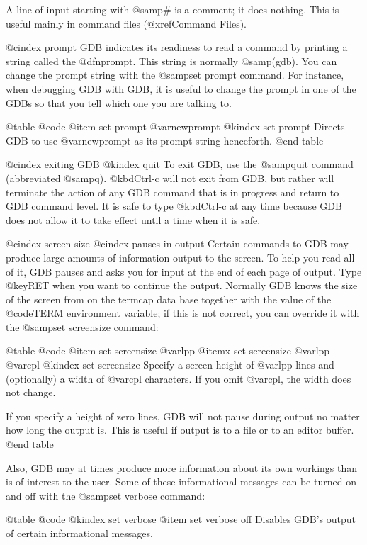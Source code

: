 A line of input starting with @samp{#} is a comment; it does nothing.
This is useful mainly in command files (@xref{Command Files}).

@cindex prompt
GDB indicates its readiness to read a command by printing a string
called the @dfn{prompt}.  This string is normally @samp{(gdb)}.  You can
change the prompt string with the @samp{set prompt} command.  For
instance, when debugging GDB with GDB, it is useful to change the prompt
in one of the GDBs so that you tell which one you are talking to.

@table @code
@item set prompt @var{newprompt}
@kindex set prompt
Directs GDB to use @var{newprompt} as its prompt string henceforth.
@end table

@cindex exiting GDB
@kindex quit
To exit GDB, use the @samp{quit} command (abbreviated @samp{q}).
@kbd{Ctrl-c} will not exit from GDB, but rather will terminate the action
of any GDB command that is in progress and return to GDB command level.
It is safe to type @kbd{Ctrl-c} at any time because GDB does not allow
it to take effect until a time when it is safe.

@cindex screen size
@cindex pauses in output
Certain commands to GDB may produce large amounts of information output
to the screen.  To help you read all of it, GDB pauses and asks you for
input at the end of each page of output.  Type @key{RET} when you want
to continue the output.  Normally GDB knows the size of the screen from
on the termcap data base together with the value of the @code{TERM}
environment variable; if this is not correct, you can override it with
the @samp{set screensize} command:

@table @code
@item set screensize @var{lpp}
@itemx set screensize @var{lpp} @var{cpl}
@kindex set screensize
Specify a screen height of @var{lpp} lines and (optionally) a width of
@var{cpl} characters.  If you omit @var{cpl}, the width does not change.

If you specify a height of zero lines, GDB will not pause during output
no matter how long the output is.  This is useful if output is to a file
or to an editor buffer.
@end table

Also, GDB may at times produce more information about its own workings
than is of interest to the user.  Some of these informational messages
can be turned on and off with the @samp{set verbose} command:

@table @code
@kindex set verbose
@item set verbose off
Disables GDB's output of certain informational messages.

